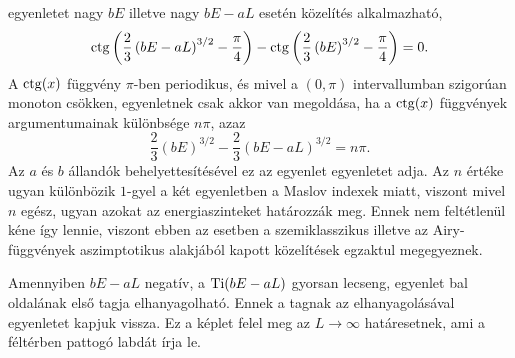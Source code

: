  egyenletet nagy $bE$ illetve nagy $bE-aL$ esetén  közelítés alkalmazható,
\begin{equation}
	\operatorname{ctg}\left(\frac{2}{3}\left(bE-aL\right)^{3/2}-\frac{\pi}{4}\right)-\operatorname{ctg}\left(\frac{2}{3}\left(bE\right)^{3/2}-\frac{\pi}{4}\right)=0.
	\label{quantumApprox:cot}
\end{equation}
A $\operatorname{ctg}(x)$ függvény $\pi$-ben periodikus, és mivel a $(0,\pi)$ intervallumban szigorúan monoton csökken,  egyenletnek csak akkor van megoldása, ha a $\operatorname{ctg}(x)$ függvények argumentumainak különbsége $n\pi$, azaz
\begin{equation}
	\frac{2}{3}\left(bE\right)^{3/2}-\frac{2}{3}\left(bE-aL\right)^{3/2}=n\pi.
\end{equation}
Az $a$ és $b$ állandók behelyettesítésével ez az egyenlet  egyenletet adja. Az $n$  értéke ugyan különbözik $1$-gyel a két egyenletben a Maslov indexek miatt, viszont mivel $n$ egész, ugyan azokat az energiaszinteket határozzák meg. Ennek nem feltétlenül kéne így lennie, viszont ebben az esetben a szemiklasszikus illetve az Airy-függvények aszimptotikus alakjából kapott közelítések egzaktul megegyeznek.

Amennyiben $bE-aL$ negatív, a $\mathrm{Ti}(bE-aL)$ gyorsan lecseng,  egyenlet bal oldalának első tagja elhanyagolható. Ennek a tagnak az elhanyagolásával  egyenletet kapjuk vissza. Ez a képlet felel meg az $L\to\infty$ határesetnek, ami a féltérben pattogó labdát írja le.


